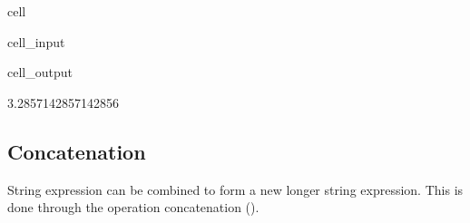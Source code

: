\documentclass[letterpaper,10pt,english]{jupyterBook}
\begin{document}
\begin{sphinxuseclass}{cell}\begin{sphinxVerbatimInput}

\begin{sphinxuseclass}{cell_input}
\begin{sphinxVerbatim}[commandchars=\\\{\}]
    
\end{sphinxVerbatim}

\end{sphinxuseclass}\end{sphinxVerbatimInput}
\begin{sphinxVerbatimOutput}

\begin{sphinxuseclass}{cell_output}
\begin{sphinxVerbatim}[commandchars=\\\{\}]
\PYGZsq{}3.2857142857142856\PYGZsq{}
\end{sphinxVerbatim}

\end{sphinxuseclass}\end{sphinxVerbatimOutput}

\end{sphinxuseclass}

\subsection{Concatenation}
\label{\detokenize{datatypes:concatenation}}
\sphinxAtStartPar
String expression can be combined to form a new longer string expression.
This is done through the operation concatenation (\sphinxcode{\sphinxupquote{+}}).
\end{document}
